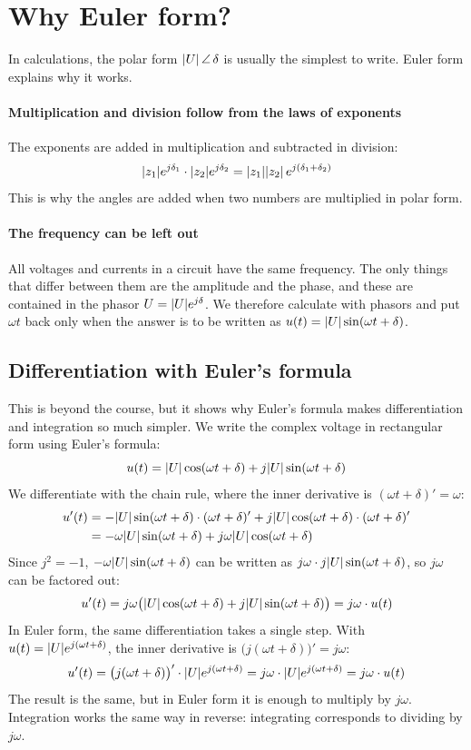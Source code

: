 \section{Why Euler form?}
\label{c16:sec:varfor}
In calculations, the polar form $\lvert U\rvert\,\angle\,\delta$ is usually the simplest to write. Euler
form explains why it works.

\paragraph{Multiplication and division follow from the laws of exponents} The exponents are added
in multiplication and subtracted in division:
\[
  \lvert z_1\rvert e^{j\delta_1} \cdot \lvert z_2\rvert e^{j\delta_2} = \lvert z_1\rvert\lvert z_2\rvert\,e^{j(\delta_1 + \delta_2)}
\]
This is why the angles are added when two numbers are multiplied in polar form.

\paragraph{The frequency can be left out} All voltages and currents in a circuit have the same
frequency. The only things that differ between them are the amplitude and the phase, and these are
contained in the phasor $U = \lvert U\rvert e^{j\delta}$. We therefore calculate with phasors and put
$\omega t$ back only when the answer is to be written as $u(t) = \lvert U\rvert\sin(\omega t + \delta)$.

\subsection{Differentiation with Euler's formula}
This is beyond the course, but it
shows why Euler's formula makes differentiation and integration so much simpler. We write the
complex voltage in rectangular form using Euler's formula:
\[
  u(t) = \lvert U\rvert\cos(\omega t + \delta) + j\lvert U\rvert\sin(\omega t + \delta)
\]
We differentiate with the chain rule, where the inner derivative is $(\omega t + \delta)' = \omega$:
\begin{align*}
  u'(t) &= -\lvert U\rvert\sin(\omega t + \delta) \cdot (\omega t + \delta)'
           + j\lvert U\rvert\cos(\omega t + \delta) \cdot (\omega t + \delta)' \\
        &= -\omega\lvert U\rvert\sin(\omega t + \delta) + j\omega\lvert U\rvert\cos(\omega t + \delta)
\end{align*}
Since $j^2 = -1$, $-\omega\lvert U\rvert\sin(\omega t + \delta)$ can be written as
$j\omega \cdot j\lvert U\rvert\sin(\omega t + \delta)$, so $j\omega$ can be factored out:
\[
  u'(t) = j\omega\bigl(\lvert U\rvert\cos(\omega t + \delta) + j\lvert U\rvert\sin(\omega t + \delta)\bigr)
        = j\omega \cdot u(t)
\]
In Euler form, the same differentiation takes a single step. With
$u(t) = \lvert U\rvert e^{j(\omega t + \delta)}$, the inner derivative is
$\bigl(j(\omega t + \delta)\bigr)' = j\omega$:
\[
  u'(t) = \bigl(j(\omega t + \delta)\bigr)' \cdot \lvert U\rvert e^{j(\omega t + \delta)}
        = j\omega \cdot \lvert U\rvert e^{j(\omega t + \delta)} = j\omega \cdot u(t)
\]
The result is the same, but in Euler form it is enough to multiply by $j\omega$. Integration works
the same way in reverse: integrating corresponds to dividing by $j\omega$.

